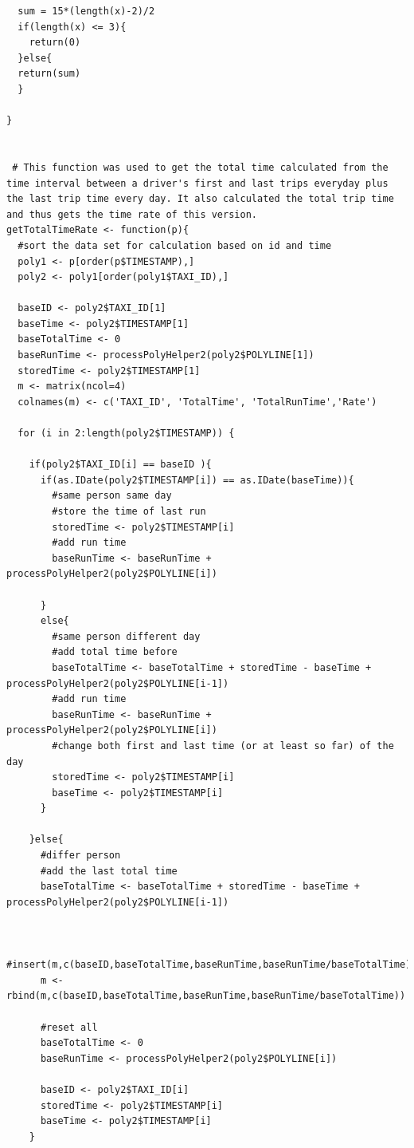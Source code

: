 \documentclass[letterpaper, 12 pt, conference]{article}
\begin{document}
\begin{lstlisting}
  sum = 15*(length(x)-2)/2
  if(length(x) <= 3){
    return(0)
  }else{
  return(sum)
  }
  
}


 # This function was used to get the total time calculated from the time interval between a driver's first and last trips everyday plus the last trip time every day. It also calculated the total trip time and thus gets the time rate of this version.
getTotalTimeRate <- function(p){
  #sort the data set for calculation based on id and time
  poly1 <- p[order(p$TIMESTAMP),]
  poly2 <- poly1[order(poly1$TAXI_ID),]
  
  baseID <- poly2$TAXI_ID[1]
  baseTime <- poly2$TIMESTAMP[1]
  baseTotalTime <- 0
  baseRunTime <- processPolyHelper2(poly2$POLYLINE[1]) 
  storedTime <- poly2$TIMESTAMP[1]
  m <- matrix(ncol=4)
  colnames(m) <- c('TAXI_ID', 'TotalTime', 'TotalRunTime','Rate')
  
  for (i in 2:length(poly2$TIMESTAMP)) {
    
    if(poly2$TAXI_ID[i] == baseID ){
      if(as.IDate(poly2$TIMESTAMP[i]) == as.IDate(baseTime)){
        #same person same day
        #store the time of last run
        storedTime <- poly2$TIMESTAMP[i]
        #add run time
        baseRunTime <- baseRunTime + processPolyHelper2(poly2$POLYLINE[i])
        
      }
      else{
        #same person different day
        #add total time before
        baseTotalTime <- baseTotalTime + storedTime - baseTime + processPolyHelper2(poly2$POLYLINE[i-1])
        #add run time
        baseRunTime <- baseRunTime + processPolyHelper2(poly2$POLYLINE[i])
        #change both first and last time (or at least so far) of the day
        storedTime <- poly2$TIMESTAMP[i]
        baseTime <- poly2$TIMESTAMP[i]
      }
      
    }else{
      #differ person
      #add the last total time
      baseTotalTime <- baseTotalTime + storedTime - baseTime + processPolyHelper2(poly2$POLYLINE[i-1])
      
      
      #insert(m,c(baseID,baseTotalTime,baseRunTime,baseRunTime/baseTotalTime))
      m <- rbind(m,c(baseID,baseTotalTime,baseRunTime,baseRunTime/baseTotalTime))
      
      #reset all
      baseTotalTime <- 0
      baseRunTime <- processPolyHelper2(poly2$POLYLINE[i])
      
      baseID <- poly2$TAXI_ID[i]
      storedTime <- poly2$TIMESTAMP[i]
      baseTime <- poly2$TIMESTAMP[i]
    }
    

\end{lstlisting}
\end{document}
